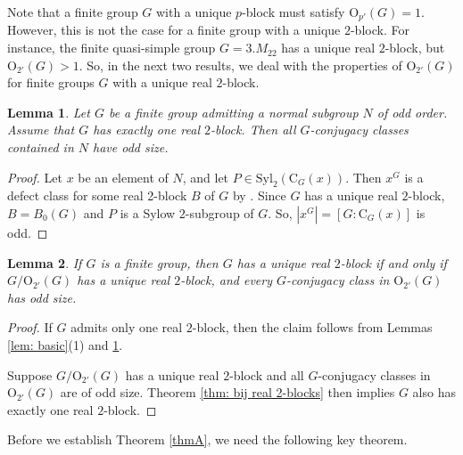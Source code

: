 \documentclass[10pt]{article}
\newtheorem{lem}{\bf Lemma}[section]
\begin{document}
Note that a finite group $G$ with a unique $p$-block 
must satisfy $\mathrm{O}_{p'}(G)=1$.
However, this is not the case for a finite group with a unique $2$-block.
For instance, 
the finite quasi-simple group
$G=3.M_{22}$ has a unique real $2$-block,
but $\mathrm{O}_{2'}(G)>1$.
So, in the next two results,
we deal with the properties of $\mathrm{O}_{2'}(G)$
for finite groups $G$ with a unique real $2$-block.








\begin{lem}\label{lem: conj class in N}
Let $G$ be a finite group admitting a normal subgroup $N$ of odd order.
 Assume that $G$ has exactly one real $2$-block. 
Then all $G$-conjugacy classes contained in $N$ have odd size.
\end{lem}
\begin{proof}
   Let $x$ be an element of $N$, and let $P\in \mathrm{Syl}_{2}(\mathrm{C}_{G}(x))$.
   Then $x^G$ is a defect class for some real 2-block $B$ of $G$ by \cite[Lemma 5.8]{gow00}.
   Since $G$ has a unique real $2$-block, $B=B_0(G)$ and $P$ is a Sylow $2$-subgroup of $G$.
   So, $|x^{G}|=[G:\mathrm{C}_{G}(x)]$ is odd.
\end{proof}






\begin{lem}\label{lem: G/N unique real block, conjugacy size odd}
  If $G$ is a finite group,
  then $G$ has a unique real $2$-block 
  if and only if $G/\mathrm{O}_{2'}(G)$ has a unique real $2$-block,
  and every $G$-conjugacy class in $\mathrm{O}_{2'}(G)$ has odd size.
\end{lem}
\begin{proof}
If $G$ admits only one real $2$-block, then the claim follows from Lemmas \ref{lem: basic}(1) and \ref{lem: conj class in N}.

Suppose $G/\mathrm{O}_{2'}(G)$ has a unique real $2$-block and all $G$-conjugacy classes in $\mathrm{O}_{2'}(G)$ are of odd size.
    Theorem \ref{thm: bij real 2-blocks} then implies $G$ also has exactly one real $2$-block.
\end{proof}




Before we establish Theorem \ref{thmA}, we need the following key theorem.
\end{document}
